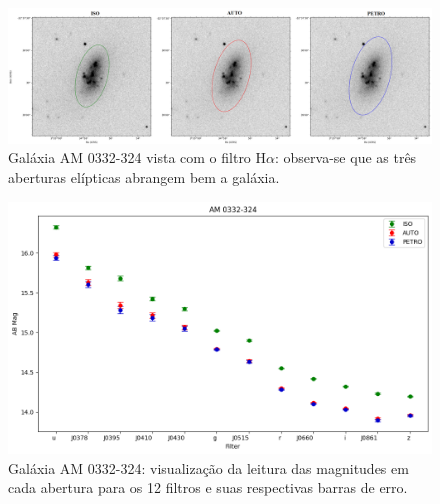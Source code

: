 \begin{figure}[!h]
  \centering 
  \includegraphics[width=1.0\textwidth]{Imagens/aberturas_am0332324.png} 
  \caption[Aberturas aplicadas à galáxia AM 0332-324.]{Galáxia AM 0332-324 vista com o filtro H$\alpha$: observa-se que as três aberturas elípticas abrangem bem a galáxia.}
  \label{fig:aberturas_am0332324} 
\end{figure}

\begin{figure}
  \centering 
  \includegraphics[width=1.0\textwidth]{Imagens/am0332324barraerro.png} 
  \caption[AM 0332-324: magnitudes em cada abertura para os 12 filtros.]{Galáxia AM 0332-324: visualização da leitura das magnitudes em cada abertura para os 12 filtros e suas respectivas barras de erro.}
  \label{fig:am0332324barraerro} 
\end{figure}

